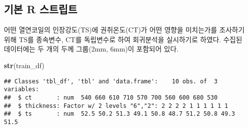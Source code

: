 \documentclass[]{book}
\newenvironment{Shaded}{\begin{snugshade}}{\end{snugshade}}
\newcommand{\DataTypeTok}[1]{\textcolor[rgb]{0.13,0.29,0.53}{#1}}
\newcommand{\DecValTok}[1]{\textcolor[rgb]{0.00,0.00,0.81}{#1}}
\newcommand{\FloatTok}[1]{\textcolor[rgb]{0.00,0.00,0.81}{#1}}
\newcommand{\KeywordTok}[1]{\textcolor[rgb]{0.13,0.29,0.53}{\textbf{#1}}}
\newcommand{\NormalTok}[1]{#1}
\newcommand{\OperatorTok}[1]{\textcolor[rgb]{0.81,0.36,0.00}{\textbf{#1}}}
\newcommand{\StringTok}[1]{\textcolor[rgb]{0.31,0.60,0.02}{#1}}
\begin{document}
\hypertarget{regression-indicator-variable-basic-script}{%
\subsection{기본 R 스트립트}\label{regression-indicator-variable-basic-script}}

어떤 열연코일의 인장강도(TS)에 권취온도(CT)가 어떤 영향을 미치는가를 조사하기 위해 TS를 종속변수, CT를 독립변수로 하여 회귀분석을 실시하기로 하였다. 수집된 데이터에는 두 개의 두께 그룹(2mm, 6mm)이 포함되어 있다.

\begin{Shaded}
\end{Shaded}

\begin{Shaded}
\begin{Highlighting}[]
\KeywordTok{str}\NormalTok{(train_df)}
\end{Highlighting}
\end{Shaded}

\begin{verbatim}
## Classes 'tbl_df', 'tbl' and 'data.frame':    10 obs. of  3 variables:
##  $ ct       : num  540 660 610 710 570 700 560 600 680 530
##  $ thickness: Factor w/ 2 levels "6","2": 2 2 2 2 1 1 1 1 1 1
##  $ ts       : num  52.5 50.2 51.3 49.1 50.8 48.7 51.2 50.8 49.3 51.5
\end{verbatim}
\end{document}
